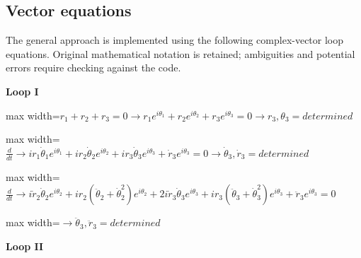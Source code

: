 \documentclass[11pt,a4paper]{article}
\begin{document}
\subsection{Vector equations}

The general approach is implemented using the following complex-vector loop equations. Original mathematical notation is retained; ambiguities and potential errors require checking against the code.

\textbf{Loop I}

\begin{center}\begin{adjustbox}{max width=\linewidth}$\displaystyle {r}_{1}+{r}_{2}+{r}_{3}=0\rightarrow {r}_{1}{e}^{i{\theta }_{1}}+{r}_{2}{e}^{i{\theta }_{2}}+{r}_{3}{e}^{i{\theta }_{3}}=0\rightarrow {r}_{3},{\theta }_{3}=determined$\end{adjustbox}\end{center}

\begin{center}\begin{adjustbox}{max width=\linewidth}$\displaystyle \frac{d}{dt}\rightarrow i{r}_{1}{\dot{\theta }}_{1}{e}^{i{\theta }_{1}}+i{r}_{2}{\dot{\theta }}_{2}{e}^{i{\theta }_{2}}+i{r}_{3}{\dot{\theta }}_{3}{e}^{i{\theta }_{3}}+{\dot{r}}_{3}{e}^{i{\theta }_{3}}=0\rightarrow {\dot{\theta }}_{3},{\dot{r}}_{3}=determined$\end{adjustbox}\end{center}

\begin{center}\begin{adjustbox}{max width=\linewidth}$\displaystyle \frac{d}{dt}\rightarrow i{\dot{r}}_{2}{\dot{\theta }}_{2}{e}^{i{\theta }_{2}}+i{r}_{2}\left( {\ddot{\theta }}_{2}+{\dot{\theta }}_{2}^{2}\right){e}^{i{\theta }_{2}}+2i{\dot{r}}_{3}{\dot{\theta }}_{3}{e}^{i{\theta }_{3}}+i{r}_{3}\left( {\ddot{\theta }}_{3}+{\dot{\theta }}_{3}^{2}\right){e}^{i{\theta }_{3}}+{\ddot{r}}_{3}{e}^{i{\theta }_{3}}=0$\end{adjustbox}\end{center}

\begin{center}\begin{adjustbox}{max width=\linewidth}$\displaystyle \rightarrow {\ddot{\theta }}_{3},{\ddot{r}}_{3}=determined$\end{adjustbox}\end{center}

\textbf{Loop II}
\end{document}
